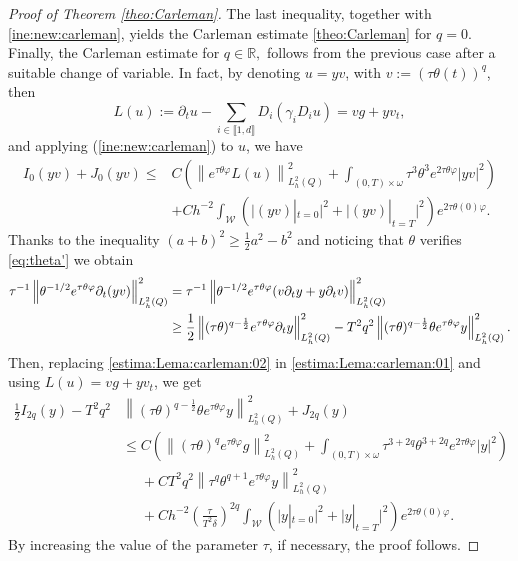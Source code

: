 \documentclass{amsart}
\numberwithin{equation}{section}
\begin{document}
\begin{proof}[Proof of Theorem \ref{theo:Carleman}]
The last inequality, together with \eqref{ine:new:carleman}, yields the Carleman estimate \eqref{theo:Carleman} for $q=0$.\\
Finally, the Carleman estimate for $q\in\mathbb{R},$ follows from the previous case after a suitable change of variable. In fact, by denoting $u=yv$, with $ v:= (\tau \theta(t))^q$, then  $$L(u):= \partial_{t}u -\sum_{i\in\llbracket 1,d\rrbracket}D_{i}(\gamma_{i}D_{i}u)=vg+yv_t,$$ and applying (\ref{ine:new:carleman}) to $u$, we have
\begin{align}\label{estima:Lema:carleman:01} 
   I_0(yv)+J_0(yv)\leq &C\left(\left\|e^{\tau\theta\varphi}L(u)\right\|^{2}_{L_{h}^{2}(Q)}+\int_{(0,T)\times\omega}\tau^3\theta^3e^{2\tau\theta\varphi}|yv|^2\right)\\
     &+Ch^{-2}\int_{\mathcal{W}} \left(\Big|(yv)|_{t=0}\Big|^2+\Big|(yv)|_{t=T}\Big|^2\right)e^{2\tau\theta(0)\varphi}.\nonumber
\end{align}
Thanks to the inequality $\displaystyle (a+b)^{2}\geq \frac{1}{2}a^{2}-b^{2}$ and noticing that $\theta$ verifies \eqref{eq:theta'} we obtain
\begin{align}\label{estima:Lema:carleman:02}
    \tau^{-1}\left\|\theta^{-1/2}e^{\tau \theta \varphi}\partial_{t}(yv)\right\|^{2}_{L_{h}^{2}(Q)}&= \tau^{-1}\left\|\theta^{-1/2}e^{\tau\theta\varphi}(v\partial_{t}y+y\partial_{t}v) \right\|^{2}_{L_{h}^{2}(Q)}\\
    &\geq \frac{1}{2}\left\|(\tau \theta)^{q-\frac{1}{2}} e^{\tau\theta\varphi}\partial_{t}y\right\|^{2}_{L_{h}^{2}(Q)}-T^2{q}^2\left\|(\tau \theta)^{q-\frac{1}{2}}\theta e^{\tau\theta\varphi}y\right\|^{2}_{L_{h}^{2}(Q)}.\notag
\end{align}
Then, replacing \eqref{estima:Lema:carleman:02} in \eqref{estima:Lema:carleman:01} and using  $L(u)=vg+yv_t$, we get
  \begin{align*}
   \frac{1}{2}I_{2q}(y)-T^2q^2&\left\|(\tau \theta)^{q-\frac{1}{2}}\theta e^{\tau\theta\varphi}y\right\|^{2}_{L_{h}^{2}(Q)}+ J_{2q}(y) 
   \\
   &\le C\left(\left\|(\tau\theta)^{q}e^{\tau\theta\varphi}g\right\|^{2}_{L_{h}^{2}(Q)}+\int_{(0,T)\times\omega}\tau^{3+2q}\theta^{3+2q}e^{2\tau\theta\varphi}|y|^2\right)\\
    &\phantom{\le}+CT^2{q}^2\left\|\tau^{q}\theta^{q+1} e^{\tau\theta\varphi}y\right\|^{2}_{L_{h}^{2}(Q)} \\
     &\phantom{\le}+Ch^{-2}\left(\frac{\tau}{T^{2}\delta}\right)^{2q}\int_{\mathcal{W}} \left(\Big|y|_{t=0}\Big|^2+\Big|y|_{t=T}\Big|^2\right)e^{2\tau\theta(0)\varphi}.
\end{align*}
By increasing the value of the parameter $\tau$, if necessary, the proof follows. 
\end{proof}
\end{document}
